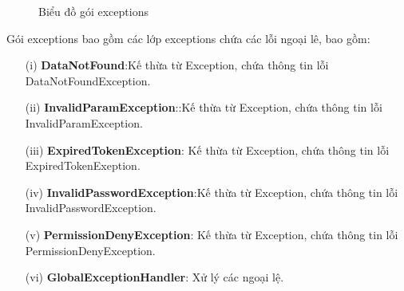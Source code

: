 \documentclass[../DoAn.tex]{subfiles}
\begin{document}
\begin{figure}[H]
    \centering
    \caption{Biểu đồ gói exceptions}
    \label{fig:Fig7}
\end{figure}
Gói exceptions bao gồm các lớp exceptions chứa các lỗi ngoại lê, bao gồm:
\begin{enumerate}
    \item [(i)] \textbf{DataNotFound}:Kế thừa từ Exception, chứa thông tin lỗi DataNotFoundException.
    \item [(ii)]\textbf{InvalidParamException}::Kế thừa từ Exception, chứa thông tin lỗi InvalidParamException.
    \item[(iii)] \textbf{ExpiredTokenException}: Kế thừa từ Exception, chứa thông tin lỗi ExpiredTokenExeption.
    \item[(iv)] \textbf{InvalidPasswordException}:Kế thừa từ Exception, chứa thông tin lỗi InvalidPasswordException.
    \item[(v)] \textbf{PermissionDenyException}: Kế thừa từ Exception, chứa thông tin lỗi PermissionDenyException.
    \item[(vi)] \textbf{GlobalExceptionHandler}: Xử lý các ngoại lệ.
\end{enumerate}
\end{document}

